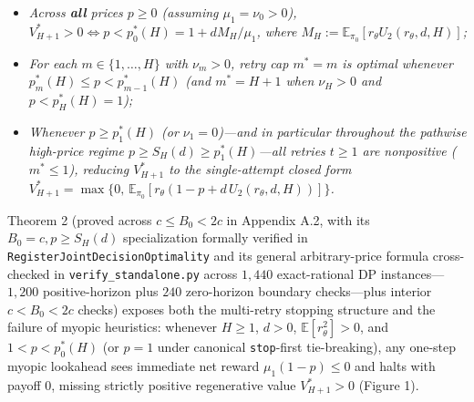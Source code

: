 \documentclass[11pt,letterpaper]{article}
\providecommand{\tightlist}{\setlength{\itemsep}{2pt}\setlength{\parskip}{0pt}}
\begin{document}
\begin{enumerate}
  \begin{itemize}
  \tightlist
  \item
    \emph{Across \textbf{all} prices \(p \ge 0\) (assuming
    \(\mu_1 = \nu_0 > 0\)),
    \(V_{H+1}^* > 0 \iff p < p_0^*(H) = 1 + d M_H / \mu_1\), where
    \(M_H := \mathbb{E}_{\pi_0}[r_\theta U_2(r_\theta, d, H)]\);}
  \item
    \emph{For each \(m \in \{1, \dots, H\}\) with \(\nu_m > 0\), retry
    cap \(m^* = m\) is optimal whenever
    \(p_m^*(H) \le p < p_{m-1}^*(H)\) (and \(m^* = H + 1\) when
    \(\nu_H > 0\) and \(p < p_H^*(H) = 1\));}
  \item
    \emph{Whenever \(p \ge p_1^*(H)\) (or \(\nu_1 = 0\))---and in
    particular throughout the pathwise high-price regime
    \(p \ge S_H(d) \ge p_1^*(H)\)---all retries \(t \ge 1\) are
    nonpositive (\(m^* \le 1\)), reducing \(V_{H+1}^*\) to the
    single-attempt closed form
    \(V_{H+1}^* = \max\{0,\, \mathbb{E}_{\pi_0}[r_\theta(1 - p + d\,U_2(r_\theta, d, H))]\}\).}
  \end{itemize}
\end{enumerate}

Theorem 2 (proved across \(c \le B_0 < 2c\) in Appendix A.2, with its
\(B_0 = c, p \ge S_H(d)\) specialization formally verified in
\texttt{RegisterJointDecisionOptimality} and its general arbitrary-price
formula cross-checked in \texttt{verify\_standalone.py} across \(1,440\)
exact-rational DP instances---\(1,200\) positive-horizon plus \(240\)
zero-horizon boundary checks---plus interior \(c < B_0 < 2c\) checks)
exposes both the multi-retry stopping structure and the failure of
myopic heuristics: whenever \(H \ge 1\), \(d > 0\),
\(\mathbb{E}[r_\theta^2] > 0\), and \(1 < p < p_0^*(H)\) (or \(p = 1\)
under canonical \texttt{stop}-first tie-breaking), any one-step myopic
lookahead sees immediate net reward \(\mu_1(1 - p) \le 0\) and halts
with payoff \(0\), missing strictly positive regenerative value
\(V_{H+1}^* > 0\) (Figure 1).
\end{document}
